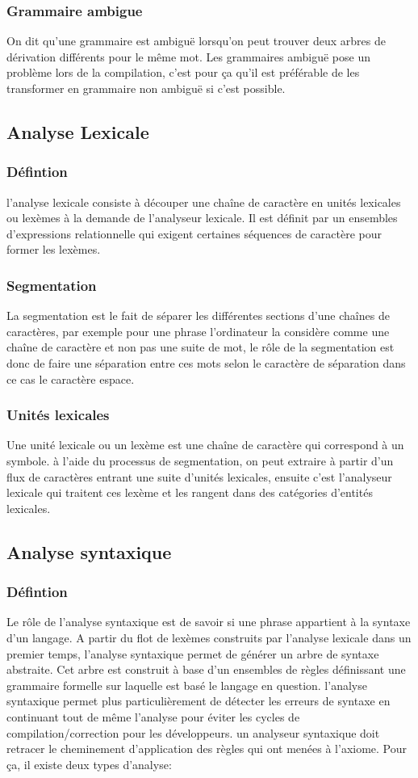 \documentclass{article}
\begin{document}
\subsubsection{Grammaire ambigue}
	On dit qu’une grammaire est ambiguë  lorsqu’on peut trouver deux arbres de dérivation différents pour le même mot.
Les grammaires ambiguë pose un problème lors de la compilation, c’est pour ça qu’il est préférable de les transformer en grammaire non ambiguë si c’est possible.

\subsection{Analyse Lexicale}
\subsubsection{Défintion}
	l’analyse lexicale consiste à découper une chaîne de caractère en unités lexicales ou lexèmes à la demande de l’analyseur lexicale.
Il est définit par un ensembles d’expressions relationnelle qui exigent certaines séquences de caractère pour former les lexèmes.
\subsubsection{Segmentation}
	La segmentation est le fait de séparer les différentes sections d’une chaînes de caractères, par exemple pour une phrase l’ordinateur la considère comme une chaîne de caractère et non pas une suite de mot, le rôle de la segmentation est donc de faire une séparation entre ces mots selon le caractère de séparation dans ce cas le caractère espace. 
\subsubsection{Unités lexicales}
	Une unité lexicale ou un lexème est une chaîne de caractère qui correspond à un symbole. à l’aide du processus de segmentation, on peut extraire à partir d’un flux de caractères entrant une suite d’unités lexicales, ensuite c’est l’analyseur lexicale qui traitent ces lexème et les rangent dans des catégories d’entités lexicales.

\subsection{Analyse syntaxique}
\subsubsection{Défintion}
	Le rôle de l’analyse syntaxique est de savoir si une phrase appartient à la syntaxe d’un langage.
A partir du flot de lexèmes construits par l’analyse lexicale dans un premier temps, l’analyse syntaxique permet de générer un arbre de syntaxe abstraite.
Cet arbre est construit à base d’un ensembles de règles définissant une grammaire formelle sur laquelle est basé le langage en question.
l’analyse syntaxique permet plus particulièrement de détecter les erreurs de syntaxe en continuant tout de même l’analyse pour éviter les cycles de compilation/correction pour les développeurs.
un analyseur syntaxique doit retracer le cheminement d’application des règles qui ont menées à l’axiome. Pour ça, il existe deux types d’analyse:
\end{document}
